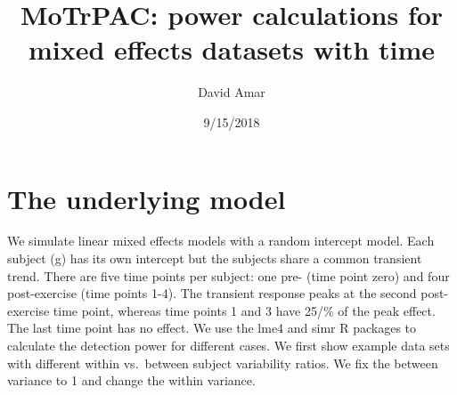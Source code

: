 \documentclass[]{article}
\title{MoTrPAC: power calculations for mixed effects datasets with time}
\author{David Amar}
\date{9/15/2018}
\begin{document}
\maketitle

\section{The underlying model}\label{the-underlying-model}

We simulate linear mixed effects models with a random intercept model.
Each subject (g) has its own intercept but the subjects share a common
transient trend. There are five time points per subject: one pre- (time
point zero) and four post-exercise (time points 1-4). The transient
response peaks at the second post-exercise time point, whereas time
points 1 and 3 have 25/\% of the peak effect. The last time point has no
effect. We use the lme4 and simr R packages to calculate the detection
power for different cases. We first show example data sets with
different within vs.~between subject variability ratios. We fix the
between variance to 1 and change the within variance.
\end{document}
